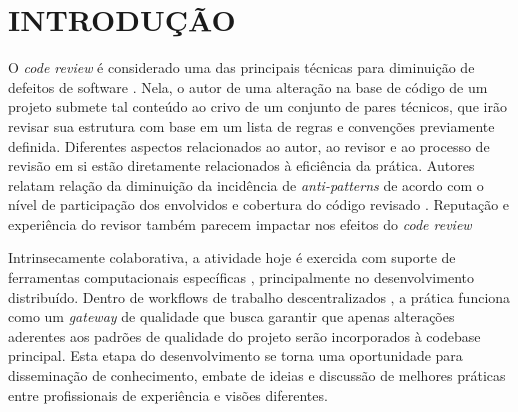 \documentclass[preprint,12pt]{elsarticle}
\begin{document}










\chapter{INTRODUÇÃO}  %

  O \textit{code review} é considerado uma das principais técnicas para diminuição de defeitos de software \cite{Boehm2001}. Nela, o autor de uma alteração na base de código de um projeto submete tal conteúdo ao crivo de um conjunto de pares técnicos, que irão revisar sua estrutura com base em um lista de regras e convenções previamente definida. Diferentes aspectos relacionados ao autor, ao revisor e ao processo de revisão em si estão diretamente relacionados à eficiência da prática. Autores relatam relação da diminuição da incidência de \textit{anti-patterns} \cite{Kemerer2009} de acordo com o nível de participação dos envolvidos e cobertura do código revisado \cite{Meneely201437, Morales2015171, Bavota201581}. Reputação \cite{Baysal2013122, Bosu2014} e experiência \cite{Kononenko2015111} do revisor também parecem impactar nos efeitos do \textit{code review}

  Intrinsecamente colaborativa, a atividade hoje é exercida com suporte de ferramentas computacionais específicas \cite{Bacchelli2013}, principalmente no desenvolvimento distribuído. Dentro de workflows de trabalho descentralizados \cite{gousios2016}, a prática funciona como um \textit{gateway} de qualidade que busca garantir que apenas alterações aderentes aos padrões de qualidade do projeto serão incorporados à codebase principal. Esta etapa do desenvolvimento se torna uma oportunidade para disseminação de conhecimento, embate de ideias e discussão de melhores práticas entre profissionais de experiência e visões diferentes.
\end{document}
